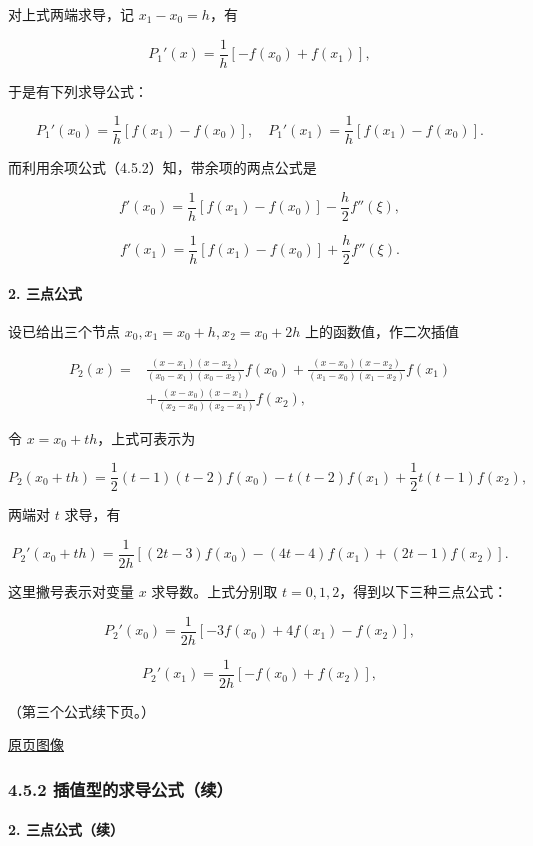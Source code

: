 \documentclass[
  10pt,
  fontset=fandol]{ctexart}
\begin{document}
对上式两端求导，记 \(x_1-x_0=h\)，有

\[
P_1'(x)=\frac1h[-f(x_0)+f(x_1)],
\]

于是有下列求导公式：

\[
P_1'(x_0)=\frac1h[f(x_1)-f(x_0)],\quad
P_1'(x_1)=\frac1h[f(x_1)-f(x_0)].
\]

而利用余项公式（4.5.2）知，带余项的两点公式是

\[
f'(x_0)=\frac1h[f(x_1)-f(x_0)]-\frac h2f''(\xi),
\]

\[
f'(x_1)=\frac1h[f(x_1)-f(x_0)]+\frac h2f''(\xi).
\]

\paragraph{2. 三点公式}\label{ux4e09ux70b9ux516cux5f0f}

设已给出三个节点 \(x_0,x_1=x_0+h,x_2=x_0+2h\) 上的函数值，作二次插值

\[
\begin{aligned}
P_2(x)={}&\frac{(x-x_1)(x-x_2)}{(x_0-x_1)(x_0-x_2)}f(x_0)
+\frac{(x-x_0)(x-x_2)}{(x_1-x_0)(x_1-x_2)}f(x_1)\\
&+\frac{(x-x_0)(x-x_1)}{(x_2-x_0)(x_2-x_1)}f(x_2),
\end{aligned}
\]

令 \(x=x_0+th\)，上式可表示为

\[
P_2(x_0+th)=\frac12(t-1)(t-2)f(x_0)-t(t-2)f(x_1)
+\frac12t(t-1)f(x_2),
\]

两端对 \(t\) 求导，有

\[
P_2'(x_0+th)=\frac1{2h}[(2t-3)f(x_0)-(4t-4)f(x_1)+(2t-1)f(x_2)].
\tag{4.5.3}
\]

这里撇号表示对变量 \(x\) 求导数。上式分别取 \(t=0,1,2\)，得到以下三种三点公式：

\[
P_2'(x_0)=\frac1{2h}[-3f(x_0)+4f(x_1)-f(x_2)],
\]

\[
P_2'(x_1)=\frac1{2h}[-f(x_0)+f(x_2)],
\]

（第三个公式续下页。）

\href{../../source-images/pdf-115.jpeg}{原页图像}

\subsubsection{4.5.2 插值型的求导公式（续）}\label{ux63d2ux503cux578bux7684ux6c42ux5bfcux516cux5f0fux7eed-1}

\paragraph{2. 三点公式（续）}\label{ux4e09ux70b9ux516cux5f0fux7eed}
\end{document}
